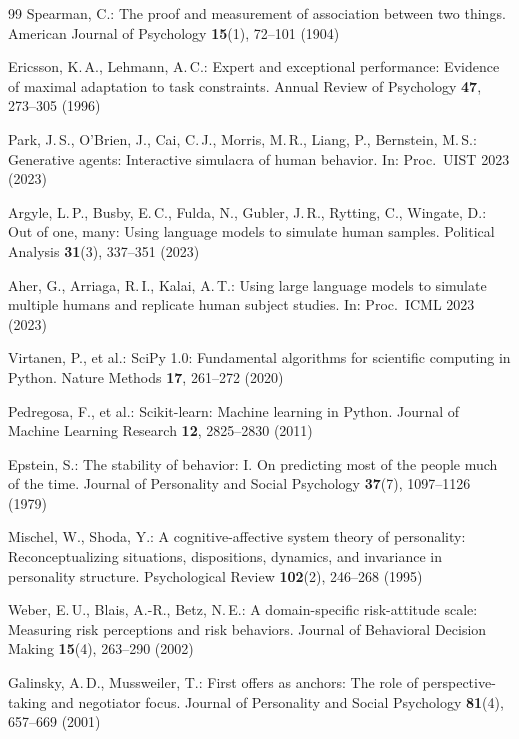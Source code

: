 \documentclass[runningheads]{llncs}
\begin{document}
\begin{thebibliography}{99}
Spearman, C.:
The proof and measurement of association between two things.
American Journal of Psychology \textbf{15}(1), 72--101 (1904)

Ericsson, K.\,A., Lehmann, A.\,C.:
Expert and exceptional performance: Evidence of maximal adaptation to
task constraints.
Annual Review of Psychology \textbf{47}, 273--305 (1996)

Park, J.\,S., O'Brien, J., Cai, C.\,J., Morris, M.\,R., Liang, P.,
Bernstein, M.\,S.:
Generative agents: Interactive simulacra of human behavior.
In: Proc.\ UIST 2023 (2023)

Argyle, L.\,P., Busby, E.\,C., Fulda, N., Gubler, J.\,R., Rytting, C.,
Wingate, D.:
Out of one, many: Using language models to simulate human samples.
Political Analysis \textbf{31}(3), 337--351 (2023)

Aher, G., Arriaga, R.\,I., Kalai, A.\,T.:
Using large language models to simulate multiple humans and replicate
human subject studies.
In: Proc.\ ICML 2023 (2023)

Virtanen, P., et al.:
SciPy 1.0: Fundamental algorithms for scientific computing in Python.
Nature Methods \textbf{17}, 261--272 (2020)

Pedregosa, F., et al.:
Scikit-learn: Machine learning in Python.
Journal of Machine Learning Research \textbf{12}, 2825--2830 (2011)

Epstein, S.:
The stability of behavior: I. On predicting most of the people much of
the time.
Journal of Personality and Social Psychology \textbf{37}(7), 1097--1126
(1979)

Mischel, W., Shoda, Y.:
A cognitive-affective system theory of personality: Reconceptualizing
situations, dispositions, dynamics, and invariance in personality
structure.
Psychological Review \textbf{102}(2), 246--268 (1995)

Weber, E.\,U., Blais, A.-R., Betz, N.\,E.:
A domain-specific risk-attitude scale: Measuring risk perceptions and
risk behaviors.
Journal of Behavioral Decision Making \textbf{15}(4), 263--290 (2002)

Galinsky, A.\,D., Mussweiler, T.:
First offers as anchors: The role of perspective-taking and negotiator
focus.
Journal of Personality and Social Psychology \textbf{81}(4), 657--669
(2001)


\end{thebibliography}
\end{document}
